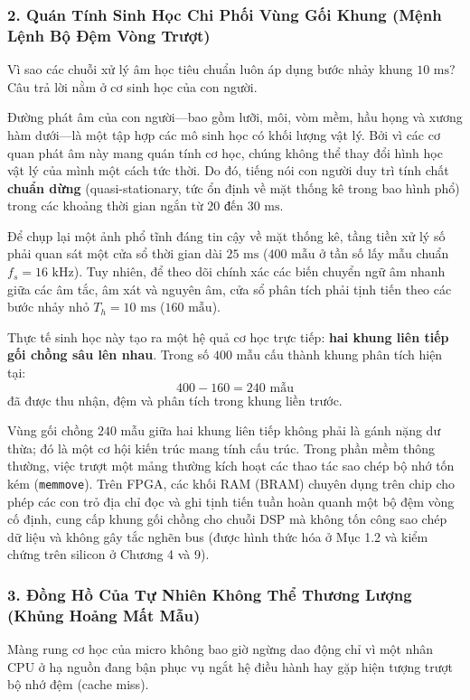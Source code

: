 \documentclass[11pt,a4paper]{article}
\begin{document}
\subsubsection*{2. Quán Tính Sinh Học Chi Phối Vùng Gối Khung (Mệnh Lệnh Bộ Đệm Vòng Trượt)}
Vì sao các chuỗi xử lý âm học tiêu chuẩn luôn áp dụng bước nhảy khung $10\text{ ms}$? Câu trả lời nằm ở cơ sinh học của con người.

Đường phát âm của con người---bao gồm lưỡi, môi, vòm mềm, hầu họng và xương hàm dưới---là một tập hợp các mô sinh học có khối lượng vật lý. Bởi vì các cơ quan phát âm này mang quán tính cơ học, chúng không thể thay đổi hình học vật lý của mình một cách tức thời. Do đó, tiếng nói con người duy trì tính chất \textbf{chuẩn dừng} (quasi-stationary, tức ổn định về mặt thống kê trong bao hình phổ) trong các khoảng thời gian ngắn từ $20\text{ đến }30\text{ ms}$.

Để chụp lại một ảnh phổ tĩnh đáng tin cậy về mặt thống kê, tầng tiền xử lý số phải quan sát một cửa sổ thời gian dài $25\text{ ms}$ ($400\text{ mẫu}$ ở tần số lấy mẫu chuẩn $f_s = 16\text{ kHz}$). Tuy nhiên, để theo dõi chính xác các biến chuyển ngữ âm nhanh giữa các âm tắc, âm xát và nguyên âm, cửa sổ phân tích phải tịnh tiến theo các bước nhảy nhỏ $T_h = 10\text{ ms}$ ($160\text{ mẫu}$).

Thực tế sinh học này tạo ra một hệ quả cơ học trực tiếp: \textbf{hai khung liên tiếp gối chồng sâu lên nhau}. Trong số $400$ mẫu cấu thành khung phân tích hiện tại:
\[
400 - 160 = 240\text{ mẫu}
\]
đã được thu nhận, đệm và phân tích trong khung liền trước.

\begin{physicalinsight}
Vùng gối chồng $240$ mẫu giữa hai khung liên tiếp không phải là gánh nặng dư thừa; đó là một cơ hội kiến trúc mang tính cấu trúc. Trong phần mềm thông thường, việc trượt một mảng thường kích hoạt các thao tác sao chép bộ nhớ tốn kém (\texttt{memmove}). Trên FPGA, các khối RAM (BRAM) chuyên dụng trên chip cho phép các con trỏ địa chỉ đọc và ghi tịnh tiến tuần hoàn quanh một bộ đệm vòng cố định, cung cấp khung gối chồng cho chuỗi DSP mà không tốn công sao chép dữ liệu và không gây tắc nghẽn bus (được hình thức hóa ở Mục 1.2 và kiểm chứng trên silicon ở Chương 4 và 9).
\end{physicalinsight}

\subsubsection*{3. Đồng Hồ Của Tự Nhiên Không Thể Thương Lượng (Khủng Hoảng Mất Mẫu)}
Màng rung cơ học của micro không bao giờ ngừng dao động chỉ vì một nhân CPU ở hạ nguồn đang bận phục vụ ngắt hệ điều hành hay gặp hiện tượng trượt bộ nhớ đệm (cache miss).
\end{document}
